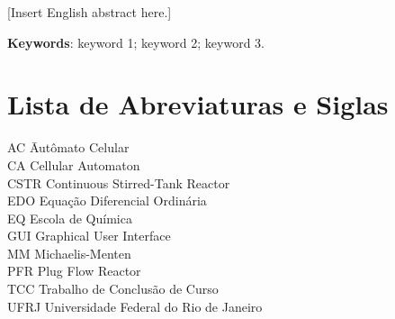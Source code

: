\documentclass[12pt,oneside]{report}
\begin{document}
[Insert English abstract here.]

\medskip

\textbf{Keywords}: keyword 1; keyword 2; keyword 3.
\newpage

\listoffigures
\newpage

\listoftables
\newpage

\chapter*{Lista de Abreviaturas e Siglas}
\begin{tabbing}
    AC \hspace{2cm} \= Autômato Celular \\
    CA \> Cellular Automaton \\
    CSTR \> Continuous Stirred-Tank Reactor \\
    EDO \> Equação Diferencial Ordinária \\
    EQ \> Escola de Química \\
    GUI \> Graphical User Interface \\
    MM \> Michaelis-Menten \\
    PFR \> Plug Flow Reactor \\
    TCC \> Trabalho de Conclusão de Curso \\
    UFRJ \> Universidade Federal do Rio de Janeiro \\
\end{tabbing}

\end{document}
